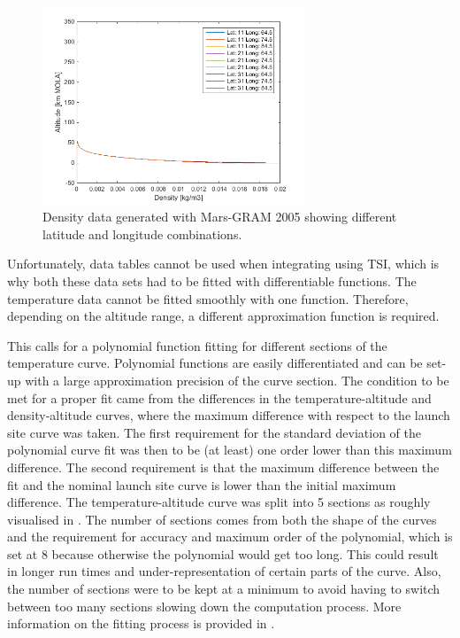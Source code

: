 \begin{figure}[H]
\centering
\includegraphics[width=0.7\textwidth]{figures/software/densityData.png}
\caption{Density data generated with Mars-\ac{GRAM} 2005 showing different latitude and longitude combinations.}
\label{fig:densityData}
\end{figure}

\noindent
Unfortunately, data tables cannot be used when integrating using \ac{TSI}, which is why both these data sets had to be fitted with differentiable functions. The temperature data cannot be fitted smoothly with one function.  Therefore, depending on the altitude range, a different approximation function is required. 

This calls for a polynomial function fitting for different sections of the temperature curve. Polynomial functions are easily differentiated and can be set-up with a large approximation precision of the curve section. The condition to be met for a proper fit came from the differences in the temperature-altitude and density-altitude curves, where the maximum difference with respect to the launch site curve was taken. The first requirement for the standard deviation of the polynomial curve fit was then to be (at least) one order lower than this maximum difference. The second requirement is that the maximum difference between the fit and the nominal launch site curve is lower than the initial maximum difference. The temperature-altitude curve was split into 5 sections as roughly visualised in . The number of sections comes from both the shape of the curves and the requirement for accuracy and maximum order of the polynomial, which is set at 8 because otherwise the polynomial would get too long. This could result in longer run times and under-representation of certain parts of the curve. Also, the number of sections were to be kept at a minimum to avoid having to switch between too many sections slowing down the computation process. More information on the fitting process is provided in .

